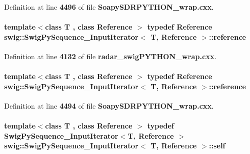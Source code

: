 Definition at line {\bf 4496} of file {\bf Soapy\+S\+D\+R\+P\+Y\+T\+H\+O\+N\+\_\+wrap.\+cxx}.

\paragraph[{reference}]{\setlength{\rightskip}{0pt plus 5cm}template$<$class T , class Reference $>$ typedef Reference {\bf swig\+::\+Swig\+Py\+Sequence\+\_\+\+Input\+Iterator}$<$ T, Reference $>$\+::{\bf reference}}\label{structswig_1_1SwigPySequence__InputIterator_a75f82d558aaa6781b77d34914eb0f455}


Definition at line {\bf 4132} of file {\bf radar\+\_\+swig\+P\+Y\+T\+H\+O\+N\+\_\+wrap.\+cxx}.

\paragraph[{reference}]{\setlength{\rightskip}{0pt plus 5cm}template$<$class T , class Reference $>$ typedef Reference {\bf swig\+::\+Swig\+Py\+Sequence\+\_\+\+Input\+Iterator}$<$ T, Reference $>$\+::{\bf reference}}\label{structswig_1_1SwigPySequence__InputIterator_a75f82d558aaa6781b77d34914eb0f455}


Definition at line {\bf 4494} of file {\bf Soapy\+S\+D\+R\+P\+Y\+T\+H\+O\+N\+\_\+wrap.\+cxx}.

\paragraph[{self}]{\setlength{\rightskip}{0pt plus 5cm}template$<$class T , class Reference $>$ typedef {\bf Swig\+Py\+Sequence\+\_\+\+Input\+Iterator}$<$T, Reference $>$ {\bf swig\+::\+Swig\+Py\+Sequence\+\_\+\+Input\+Iterator}$<$ T, Reference $>$\+::{\bf self}}\label{structswig_1_1SwigPySequence__InputIterator_a3d3f028d1d9af412c61de2b5d8630321}


